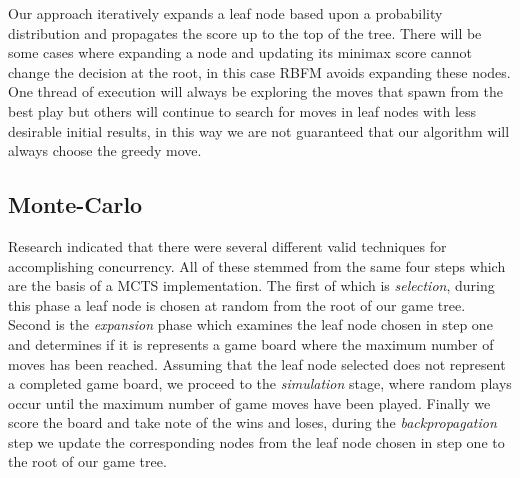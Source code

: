 \documentclass[conference]{IEEEtran}
\begin{document}
Our approach iteratively expands a leaf node based upon a probability distribution and propagates the score up to the top of the tree. There will be some cases where expanding a node and updating its minimax score cannot change the decision at the root, in this case RBFM avoids expanding these nodes. One thread of execution will always be exploring the moves that spawn from the best play but others will continue to search for moves in leaf nodes with less desirable initial results, in this way we are not guaranteed that our algorithm will always choose the greedy move.

\subsection{Monte-Carlo}
Research indicated that there were several different valid techniques for accomplishing concurrency. All of these stemmed from the same four steps which are the basis of a MCTS implementation. The first of which is \textit{selection}, during this phase a leaf node is chosen at random from the root of our game tree. Second is the \textit{expansion} phase which examines the leaf node chosen in step one and determines if it is represents a game board where the maximum number of moves has been reached. Assuming that the leaf node selected does not represent a completed game board, we proceed to the \textit{simulation} stage, where random plays occur until the maximum number of game moves have been played. Finally we score the board and take note of the wins and loses, during the \textit{backpropagation} step we update the corresponding nodes from the leaf node chosen in step one to the root of our game tree.\par
\end{document}
